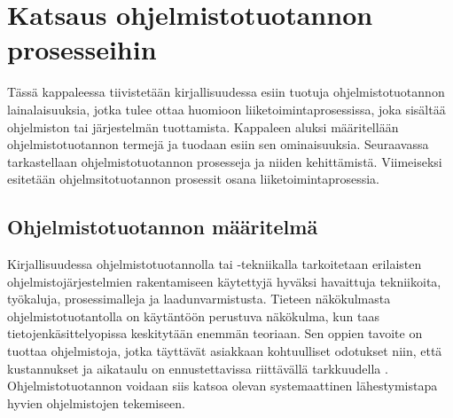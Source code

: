 \documentclass[finnish,12pt,a4paper,pdftex]{article}
\begin{document}

\clearpage

\section{Katsaus ohjelmistotuotannon prosesseihin}

Tässä kappaleessa tiivistetään kirjallisuudessa esiin tuotuja ohjelmistotuotannon lainalaisuuksia, jotka tulee ottaa huomioon liiketoimintaprosessissa, joka sisältää ohjelmiston tai järjestelmän tuottamista. Kappaleen aluksi määritellään ohjelmistotuotannon termejä ja tuodaan esiin sen ominaisuuksia. Seuraavassa tarkastellaan ohjelmistotuotannon prosesseja ja niiden kehittämistä. Viimeiseksi esitetään ohjelmsitotuotannon prosessit osana liiketoimintaprosessia.

\subsection{Ohjelmistotuotannon määritelmä}

Kirjallisuudessa ohjelmistotuotannolla tai -tekniikalla tarkoitetaan erilaisten ohjelmistojärjestelmien rakentamiseen käytettyjä hyväksi havaittuja tekniikoita, työkaluja, prosessimalleja ja laadunvarmistusta. Tieteen näkökulmasta ohjelmistotuotantolla on käytäntöön perustuva näkökulma, kun taas tietojenkäsittelyopissa keskitytään enemmän teoriaan. Sen oppien tavoite on tuottaa ohjelmistoja, jotka täyttävät asiakkaan kohtuulliset odotukset niin, että kustannukset ja aikataulu on ennustettavissa riittävällä tarkkuudella \citep{okaytannot}. Ohjelmistotuotannon voidaan siis katsoa olevan systemaattinen lähestymistapa hyvien ohjelmistojen tekemiseen.\\
\end{document}
